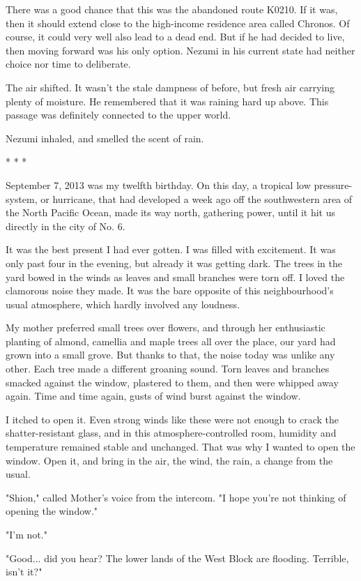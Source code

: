 There was a good chance that this was the abandoned route K0210. If it
was, then it should extend close to the high-income residence area
called Chronos. Of course, it could very well also lead to a dead end.
But if he had decided to live, then moving forward was his only option.
Nezumi in his current state had neither choice nor time to deliberate.

The air shifted. It wasn't the stale dampness of before, but fresh air
carrying plenty of moisture. He remembered that it was raining hard up
above. This passage was definitely connected to the upper world.

Nezumi inhaled, and smelled the scent of rain.

* * *

September 7, 2013 was my twelfth birthday. On this day, a tropical low
pressure-system, or hurricane, that had developed a week ago off the
southwestern area of the North Pacific Ocean, made its way north,
gathering power, until it hit us directly in the city of No. 6.

It was the best present I had ever gotten. I was filled with excitement.
It was only past four in the evening, but already it was getting dark.
The trees in the yard bowed in the winds as leaves and small branches
were torn off. I loved the clamorous noise they made. It was the bare
opposite of this neighbourhood's usual atmosphere, which hardly involved
any loudness.

My mother preferred small trees over flowers, and through her
enthusiastic planting of almond, camellia and maple trees all over the
place, our yard had grown into a small grove. But thanks to that, the
noise today was unlike any other. Each tree made a different groaning
sound. Torn leaves and branches smacked against the window, plastered to
them, and then were whipped away again. Time and time again, gusts of
wind burst against the window.

I itched to open it. Even strong winds like these were not enough to
crack the shatter-resistant glass, and in this atmosphere-controlled
room, humidity and temperature remained stable and unchanged. That was
why I wanted to open the window. Open it, and bring in the air, the
wind, the rain, a change from the usual.

"Shion," called Mother's voice from the intercom. "I hope you're not
thinking of opening the window."

"I'm not."

"Good... did you hear? The lower lands of the West Block are flooding.
Terrible, isn't it?"

